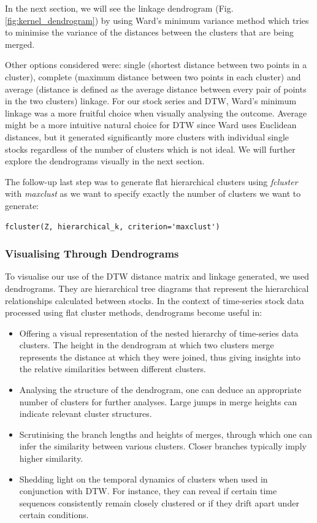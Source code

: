 \documentclass[11pt]{article}
\begin{document}
In the next section, we will see the linkage dendrogram (Fig. \ref{fig:kernel_dendrogram}) by using Ward's minimum variance method which tries to minimise the variance of the distances between the clusters that are being merged.

Other options considered were: single (shortest distance between two points in a cluster), complete (maximum distance between two points in each cluster) and average (distance is defined as the average distance between every pair of points in the two clusters) linkage. For our stock series and DTW, Ward's minimum linkage was a more fruitful choice when visually analysing the outcome. Average might be a more intuitive natural choice for DTW since Ward uses Euclidean distances, but it generated significantly more clusters with individual single stocks regardless of the number of clusters which is not ideal. We will further explore the dendrograms visually in the next section. 

The follow-up last step was to generate flat hierarchical clusters using \textit{fcluster} with \textit{maxclust} as we want to specify exactly the number of clusters we want to generate:

\begin{lstlisting}
fcluster(Z, hierarchical_k, criterion='maxclust')
\end{lstlisting}

\subsubsection{Visualising Through Dendrograms}

To visualise our use of the DTW distance matrix and linkage generated, we used dendrograms. They are hierarchical tree diagrams that represent the hierarchical relationships calculated between stocks. In the context of time-series stock data processed using flat cluster methods, dendrograms become useful in:

\begin{itemize}
    \item Offering a visual representation of the nested hierarchy of time-series data clusters. The height in the dendrogram at which two clusters merge represents the distance at which they were joined, thus giving insights into the relative similarities between different clusters.
    
    \item Analysing the structure of the dendrogram, one can deduce an appropriate number of clusters for further analyses. Large jumps in merge heights can indicate relevant cluster structures.
    
    \item Scrutinising the branch lengths and heights of merges, through which one can infer the similarity between various clusters. Closer branches typically imply higher similarity.
    
    \item Shedding light on the temporal dynamics of clusters when used in conjunction with DTW. For instance, they can reveal if certain time sequences consistently remain closely clustered or if they drift apart under certain conditions.
\end{itemize}
\end{document}
